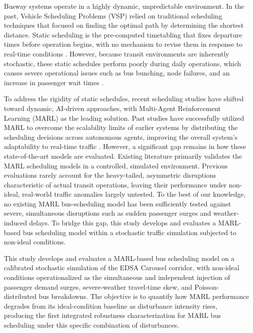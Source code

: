Busway systems operate in a highly dynamic, unpredictable environment. In the past, Vehicle Scheduling Problems (VSP) relied on traditional scheduling techniques that focused on finding the optimal path by determining the shortest distance. Static scheduling is the pre-computed timetabling that fixes departure times before operation begins, with no mechanism to revise them in response to real-time conditions \cite{Ju2023Joint,Cao2022Train,Nie2025CMRM}. However, because transit environments are inherently stochastic, these static schedules perform poorly during daily operations, which causes severe operational issues such as bus bunching, node failures, and an increase in passenger wait times \cite{Daganzo2009,FEMbusbunching}.

To address the rigidity of static schedules, recent scheduling studies have shifted toward dynamic, AI-driven approaches, with Multi-Agent Reinforcement Learning (MARL) as the leading solution. Past studies have successfully utilized MARL to overcome the scalability limits of earlier systems by distributing the scheduling decisions across autonomous agents, improving the overall system's adaptability to real-time traffic \cite{Rodriguez2023Cooperative,Wang2023MultiObj,Wangsun}. However, a significant gap remains in how these state-of-the-art models are evaluated. Existing literature primarily validates the MARL scheduling models in a controlled, simulated environment. Previous evaluations rarely account for the heavy-tailed, asymmetric disruptions characteristic of actual transit operations, leaving their performance under non-ideal, real-world traffic anomalies largely untested. To the best of our knowledge, no existing MARL bus-scheduling model has been sufficiently tested against severe, simultaneous disruptions such as sudden passenger surges and weather-induced delays. To bridge this gap, this study develops and evaluates a MARL-based bus scheduling model within a stochastic traffic simulation subjected to non-ideal conditions.

This study develops and evaluates a MARL-based bus scheduling model on a calibrated stochastic simulation of the EDSA Carousel corridor, with non-ideal conditions operationalized as the simultaneous and independent injection of passenger demand surges, severe-weather travel-time skew, and Poisson-distributed bus breakdowns. The objective is to quantify how MARL performance degrades from its ideal-condition baseline as disturbance intensity rises, producing the first integrated robustness characterization for MARL bus scheduling under this specific combination of disturbances.

